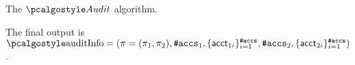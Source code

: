 \begin{boxfig}{\label{fig:audit}{The $\audit$ algorithm.}}
\begin{enumerate}

    
\end{enumerate}

The final output is $\auditinfo = (\pi = (\pi_1, \pi_2), {\numaccs}_1, \{ \acct_{1i} \}_{i=1}^\numaccs, {\numaccs}_2, \{ \acct_{2i} \}_{i=1}^\numaccs)$.
\end{boxfig}
